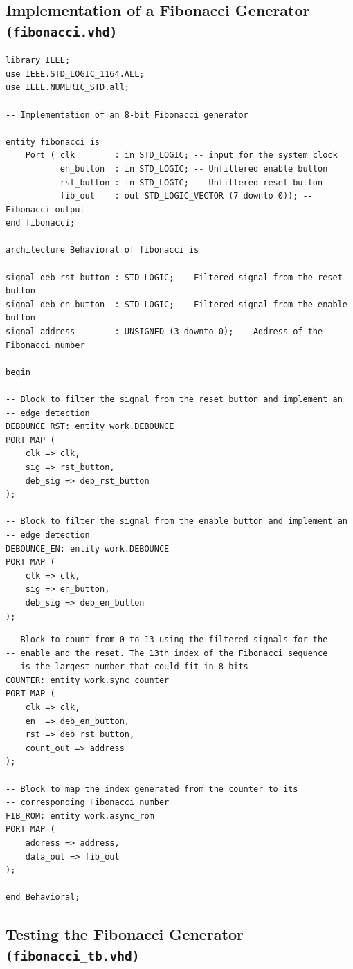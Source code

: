 \documentclass[10pt]{article}
\begin{document}
\subsection{Implementation of a Fibonacci Generator \texttt{(fibonacci.vhd)}}
\begin{verbatim}
library IEEE;
use IEEE.STD_LOGIC_1164.ALL;
use IEEE.NUMERIC_STD.all;

-- Implementation of an 8-bit Fibonacci generator

entity fibonacci is
    Port ( clk        : in STD_LOGIC; -- input for the system clock
           en_button  : in STD_LOGIC; -- Unfiltered enable button
           rst_button : in STD_LOGIC; -- Unfiltered reset button
           fib_out    : out STD_LOGIC_VECTOR (7 downto 0)); -- Fibonacci output
end fibonacci;

architecture Behavioral of fibonacci is

signal deb_rst_button : STD_LOGIC; -- Filtered signal from the reset button
signal deb_en_button  : STD_LOGIC; -- Filtered signal from the enable button
signal address        : UNSIGNED (3 downto 0); -- Address of the Fibonacci number

begin

-- Block to filter the signal from the reset button and implement an 
-- edge detection
DEBOUNCE_RST: entity work.DEBOUNCE
PORT MAP (
    clk => clk,
    sig => rst_button,
    deb_sig => deb_rst_button
);

-- Block to filter the signal from the enable button and implement an
-- edge detection
DEBOUNCE_EN: entity work.DEBOUNCE
PORT MAP (
    clk => clk,
    sig => en_button,
    deb_sig => deb_en_button
);
\end{verbatim}
\newpage
\begin{verbatim}
-- Block to count from 0 to 13 using the filtered signals for the
-- enable and the reset. The 13th index of the Fibonacci sequence
-- is the largest number that could fit in 8-bits
COUNTER: entity work.sync_counter
PORT MAP (
    clk => clk,
    en  => deb_en_button,
    rst => deb_rst_button,
    count_out => address
);

-- Block to map the index generated from the counter to its 
-- corresponding Fibonacci number
FIB_ROM: entity work.async_rom
PORT MAP (
    address => address,
    data_out => fib_out
);

end Behavioral;
\end{verbatim}
\newpage

\subsection{Testing the Fibonacci Generator \texttt{(fibonacci\_tb.vhd)}}
\end{document}
